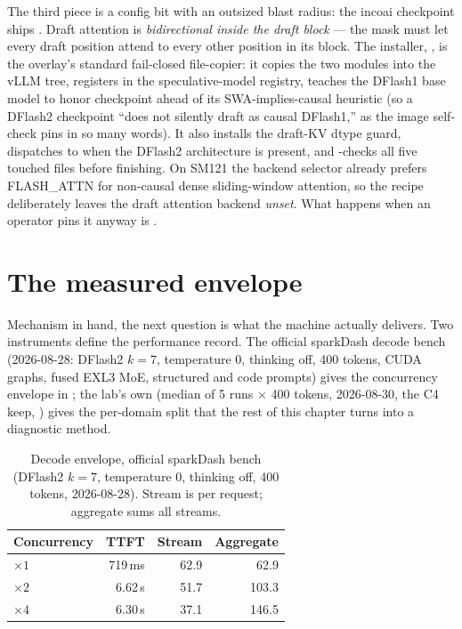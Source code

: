 The third piece is a config bit with an outsized blast radius: the incoai
checkpoint ships . Draft attention is
\emph{bidirectional inside the draft block} --- the mask must let every draft
position attend to every other position in its block. The installer,
, is the overlay's standard fail-closed
file-copier: it copies the two modules into the vLLM tree, registers
 in the speculative-model registry, teaches the
DFlash1 base model to honor checkpoint  ahead of its
SWA-implies-causal heuristic (so a DFlash2 checkpoint ``does not silently
draft as causal DFlash1,'' as the image self-check
 pins in so many words). It also
installs the draft-KV dtype guard, dispatches  to
 when the DFlash2 architecture is present, and
-checks all five touched files before finishing. On SM121
the backend selector already prefers FLASH\_ATTN for non-causal dense
sliding-window attention, so the recipe deliberately leaves the draft
attention backend \emph{unset}. What happens when an operator pins it anyway
is .

\section{The measured envelope}
\label{sec:dflash2-envelope}

Mechanism in hand, the next question is what the machine actually delivers.
Two instruments define the performance record. The official sparkDash decode
bench (2026-08-28: DFlash2 $k{=}7$, temperature 0, thinking off, 400 tokens,
CUDA graphs, fused EXL3 MoE, structured and code prompts) gives the
concurrency envelope in ; the lab's own
 (median of 5 runs $\times$ 400 tokens,
2026-08-30, the C4 keep, ) gives the
per-domain split that the rest of this chapter turns into a diagnostic
method.

\begin{table}[htbp]
\centering\small
\caption{Decode envelope, official sparkDash bench (DFlash2 $k{=}7$,
temperature 0, thinking off, 400 tokens, 2026-08-28). Stream \tokspersec{}
is per request; aggregate sums all streams.}
\label{tab:dflash2-envelope}
\begin{tabular}{lrrr}
\toprule
Concurrency & TTFT & Stream \tokspersec{} & Aggregate \tokspersec{} \\
\midrule
$\times 1$ & 719\,ms & 62.9 & 62.9 \\
$\times 2$ & 6.62\,s & 51.7 & 103.3 \\
$\times 4$ & 6.30\,s & 37.1 & 146.5 \\
\bottomrule
\end{tabular}
\end{table}

